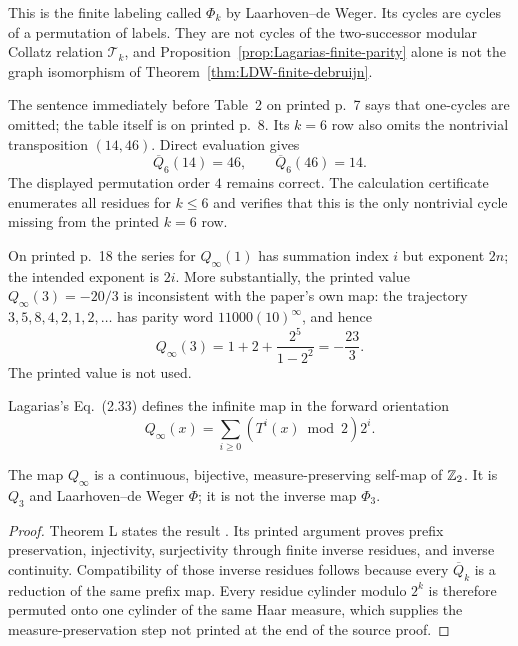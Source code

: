 This is the finite labeling called $\Phi_k$ by Laarhoven--de Weger.  Its
cycles are cycles of a permutation of labels.  They are not cycles of the
two-successor modular Collatz relation $\mathcal T_k$, and
Proposition~\ref{prop:Lagarias-finite-parity} alone is not the graph
isomorphism of Theorem~\ref{thm:LDW-finite-debruijn}.

\begin{sourceissue}
\label{sourceissue:Lagarias1985-finite-table}
The sentence immediately before Table~2 on printed p.~7 says that one-cycles
are omitted; the table itself is on printed p.~8.  Its $k=6$ row also omits
the nontrivial transposition $(14,46)$.  Direct evaluation gives
\[
 \overline Q_6(14)=46,
 \qquad
 \overline Q_6(46)=14.
\]
The displayed permutation order $4$ remains correct.  The calculation
certificate  enumerates
all residues for $k\leq6$ and verifies that this is the only nontrivial cycle
missing from the printed $k=6$ row.

On printed p.~18 the series for $Q_\infty(1)$ has summation index $i$ but
exponent $2n$; the intended exponent is $2i$.  More substantially, the
printed value $Q_\infty(3)=-20/3$ is inconsistent with the paper's own map:
the trajectory $3,5,8,4,2,1,2,\ldots$ has parity word
$11000(10)^\infty$, and hence
\[
 Q_\infty(3)=1+2+\frac{2^5}{1-2^2}=-\frac{23}{3}.
\]
The printed value is not used.
\end{sourceissue}

Lagarias's Eq.~(2.33) defines the infinite map in the forward orientation
\[
 Q_\infty(x)=\sum_{i\geq0}(T^i(x)\bmod2)2^i.
\]

\begin{proposition}
\label{prop:Lagarias-infinite-parity}
The map $Q_\infty$ is a continuous, bijective, measure-preserving self-map of
$\mathbb{Z}_{2}$.  It is $Q_3$ and Laarhoven--de Weger $\Phi$; it is not the inverse
map $\Phi_3$.
\end{proposition}

\begin{proof}
Theorem L states the result \cite[pp.~17--18]{Lagarias1985}.  Its printed
argument proves prefix preservation, injectivity, surjectivity through finite
inverse residues, and inverse continuity.  Compatibility of those inverse
residues follows because every $\overline Q_k$ is a reduction of the same
prefix map.  Every residue cylinder modulo $2^k$ is therefore permuted onto
one cylinder of the same Haar measure, which supplies the measure-preservation
step not printed at the end of the source proof.
\end{proof}

